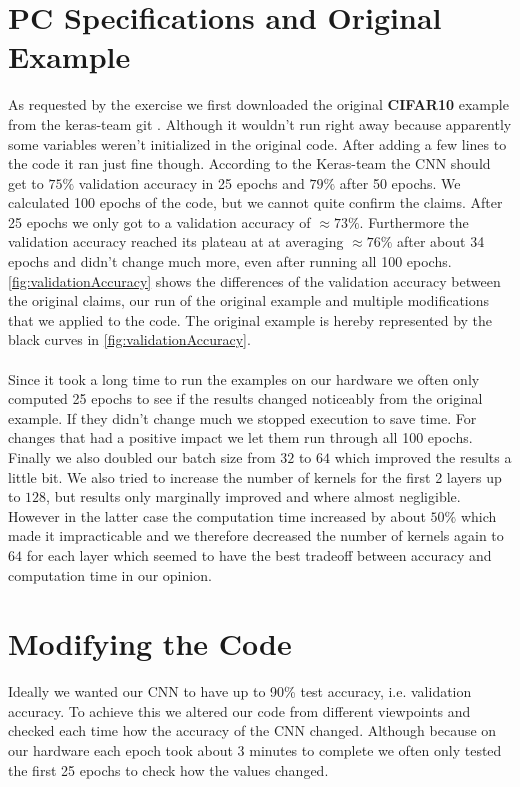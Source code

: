 \documentclass{article}
\begin{document}
	\section{PC Specifications and Original Example}
	\label{sec:PCSpecificationsAndOriginalExample}
	As requested by the exercise we first downloaded the original \textbf{CIFAR10} example from the keras-team git \cite{Keras2018CIFAR10}. Although it wouldn't run right away because apparently some variables weren't initialized in the original code. After adding a few lines to the code it ran just fine though. According to the Keras-team the CNN should get to $75\%$ validation accuracy in 25 epochs and $79\%$ after 50 epochs. We calculated 100 epochs of the code, but we cannot quite confirm the claims. After 25 epochs we only got to a validation accuracy of $\approx73\%$. Furthermore the validation accuracy reached its plateau at at averaging $\approx76\%$ after about 34 epochs and didn't change much more, even after running all 100 epochs. \autoref{fig:validationAccuracy} shows the differences of the validation accuracy between the original claims, our run of the original example and multiple modifications that we applied to the code. The original example is hereby represented by the black curves in \autoref{fig:validationAccuracy}. \\
	\\
	Since it took a long time to run the examples on our hardware we often only computed 25 epochs to see if the results changed noticeably from the original example. If they didn't change much we stopped execution to save time. For changes that had a positive impact we let them run through all 100 epochs. Finally we also doubled our batch size from $32$ to $64$ which improved the results a little bit. We also tried to increase the number of kernels for the first 2 layers up to $128$, but results only marginally improved and where almost negligible. However in the latter case the computation time increased by about $50\%$ which made it impracticable and we therefore decreased the number of kernels again to $64$ for each layer which seemed to have the best tradeoff between accuracy and computation time in our opinion. 
	
	
	\section{Modifying the Code}
	\label{sec:ModifyingTheCode}
	Ideally we wanted our CNN to have up to 90\% test accuracy, i.e. validation accuracy. To achieve this we altered our code from different viewpoints and checked each time how the accuracy of the CNN changed. Although because on our hardware each epoch took about 3 minutes to complete we often only tested the first 25 epochs to check how the values changed. \\
	
\end{document}
